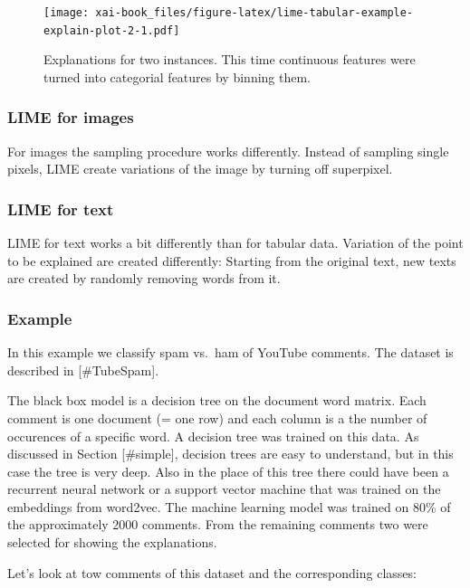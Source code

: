 \documentclass[12pt,]{krantz}
\theoremstyle{definition}
\theoremstyle{definition}
\theoremstyle{definition}
\theoremstyle{remark}
\begin{document}
\begin{figure}
\centering
\texttt{[image: xai-book\_files/figure-latex/lime-tabular-example-explain-plot-2-1.pdf]}
\caption{\label{fig:lime-tabular-example-explain-plot-2}Explanations for two
instances. This time continuous features were turned into categorial
features by binning them.}
\end{figure}

\subsubsection{LIME for images}\label{lime-for-images}

For images the sampling procedure works differently. Instead of sampling
single pixels, LIME create variations of the image by turning off
superpixel.

\subsubsection{LIME for text}\label{lime-for-text}

LIME for text works a bit differently than for tabular data. Variation
of the point to be explained are created differently: Starting from the
original text, new texts are created by randomly removing words from it.

\subsubsection{Example}\label{example-4}

In this example we classify spam vs.~ham of YouTube comments. The
dataset is described in {[}\#TubeSpam{]}.

The black box model is a decision tree on the document word matrix. Each
comment is one document (= one row) and each column is a the number of
occurences of a specific word. A decision tree was trained on this data.
As discussed in Section {[}\#simple{]}, decision trees are easy to
understand, but in this case the tree is very deep. Also in the place of
this tree there could have been a recurrent neural network or a support
vector machine that was trained on the embeddings from word2vec. The
machine learning model was trained on 80\% of the approximately 2000
comments. From the remaining comments two were selected for showing the
explanations.

Let's look at tow comments of this dataset and the corresponding
classes:

\hypertarget{htmlwidget-a7e2e3f97b18ee50788e}{}
\end{document}
